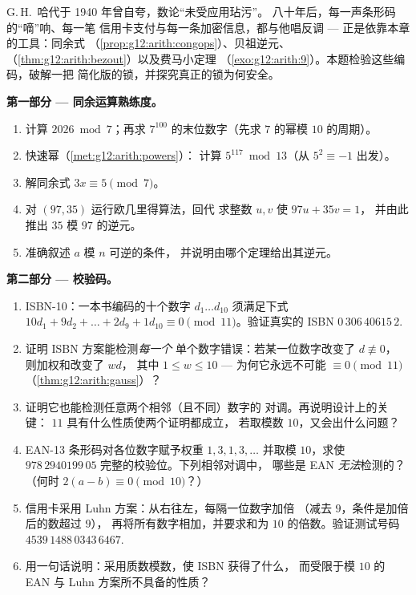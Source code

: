 \begin{problem}
\label{pb:g12:arith:1}
G.\,H.~哈代于 1940 年曾自夸，数论“未受应用玷污”。
八十年后，每一声条形码的“嘀”响、每一笔
信用卡支付与每一条加密信息，都与他唱反调
--- 正是依靠本章的工具：同余式
（\cref{prop:g12:arith:congops}）、贝祖逆元、
（\cref{thm:g12:arith:bezout}）以及费马小定理
（\cref{exo:g12:arith:9}）。本题检验这些编码，破解一把
简化版的锁，并探究真正的锁为何安全。

\medskip
\noindent\textbf{第一部分 --- 同余运算熟练度。}
\begin{enumerate}
  \item 计算 $2026 \bmod 7$；再求
        $7^{100}$ 的末位数字（先求 $7$ 的幂模
        $10$ 的周期）。
  \item 快速幂（\cref{met:g12:arith:powers}）：
        计算 $5^{117} \bmod 13$（从
        $5^2 \equiv -1$ 出发）。
  \item 解同余式 $3x \equiv 5 \pmod 7$。
  \item 对 $(97, 35)$ 运行欧几里得算法，回代
        求整数 $u, v$ 使 $97u + 35v = 1$，
        并由此推出 $35$ 模 $97$ 的逆元。
  \item 准确叙述 $a$ 模 $n$ 可逆的条件，
        并说明由哪个定理给出其逆元。
\end{enumerate}

\medskip
\noindent\textbf{第二部分 --- 校验码。}
\begin{enumerate}[resume]
  \item ISBN-10：一本书编码的十个数字 $d_1 \dots d_{10}$
        须满足下式
        $10d_1 + 9d_2 + \dots + 2d_9 + 1d_{10} \equiv 0
        \pmod{11}$。验证真实的 ISBN
        $0\,306\,40615\,2$.
  \item 证明 ISBN 方案能检测\emph{每一个}
        单个数字错误：若某一位数字改变了 $d \not\equiv 0$，
        则加权和改变了 $w d$，
        其中 $1 \leq w \leq 10$ --- 为何它永远不可能
        $\equiv 0 \pmod{11}$
        （\cref{thm:g12:arith:gauss}）？
  \item 证明它也能检测任意两个相邻（且不同）数字的
        对调。再说明设计上的关键：
        $11$ 具有什么性质使两个证明都成立，
        若取模数 $10$，又会出什么问题？
  \item EAN-13 条形码对各位数字赋予权重 $1, 3, 1, 3, \dots$
        并取模 $10$，求使
        $978\,2940199\,05$ 完整的校验位。下列相邻对调中，
        哪些是 EAN \emph{无法}检测的？（何时
        $2(a - b) \equiv 0 \pmod{10}$？）
  \item 信用卡采用 Luhn 方案：从右往左，每隔一位数字加倍
        （减去 $9$，条件是加倍后的数超过 $9$），
        再将所有数字相加，并要求和为
        $10$ 的倍数。验证测试号码
        $4539\,1488\,0343\,6467$.
  \item 用一句话说明：采用质数模数，使 ISBN 获得了什么，
        而受限于模 $10$ 的 EAN 与 Luhn 方案所不具备的性质？
\end{enumerate}


\end{problem}
